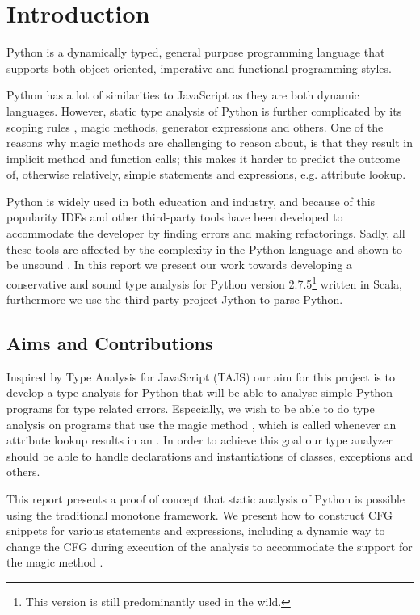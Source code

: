 \chapter{Introduction}
Python is a dynamically typed, general purpose programming language that supports both object-oriented, imperative and functional programming styles.

Python has a lot of similarities to JavaScript as they are both dynamic languages. However, static type analysis of Python is further complicated by its scoping rules \cite{lambdapy}, magic methods, generator expressions and others. One of the reasons why magic methods are challenging to reason about, is that they result in implicit method and function calls; this makes it harder to predict the outcome of, otherwise relatively, simple statements and expressions, e.g. attribute lookup.

Python is widely used in both education and industry, and because of this popularity IDEs \cite{ide.appcelerator, ide.jetbrains, ide.wingware} and other third-party tools \cite{tool.pep8, tool.pyflakes, tool.pychecker, tool.pylint} have been developed to accommodate the developer by finding errors and making refactorings. Sadly, all these tools are affected by the complexity in the Python language and shown to be unsound \cite{lamdapy}. In this report we present our work towards developing a conservative and sound type analysis for Python version 2.7.5\footnote{This version is still predominantly used in the wild.} written in Scala, furthermore we use the third-party project Jython \cite{jython} to parse Python.

\section{Aims and Contributions}
Inspired by Type Analysis for JavaScript (TAJS) \cite{tajs} our aim for this project is to develop a type analysis for Python that will be able to analyse simple Python programs for type related errors. Especially, we wish to be able to do type analysis on programs that use the magic method , which is called whenever an attribute lookup results in an . In order to achieve this goal our type analyzer should be able to handle declarations and instantiations of classes, exceptions and others.

This report presents a proof of concept that static analysis of Python is possible using the traditional monotone framework. We present how to construct CFG snippets for various statements and expressions, including a dynamic way to change the CFG during execution of the analysis to accommodate the support for the magic method .  


